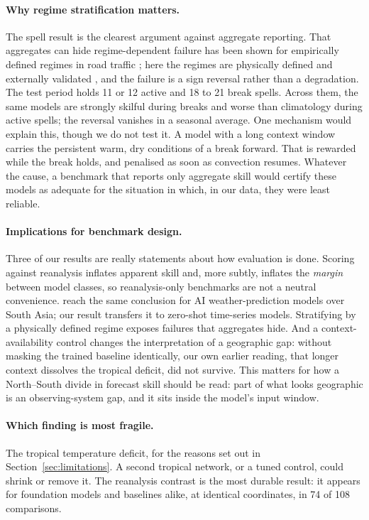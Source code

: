 \paragraph{Why regime stratification matters.} The spell result is the clearest argument against aggregate
reporting. That aggregates can hide regime-dependent failure has been shown for empirically defined regimes in
road traffic \citep{wang2026regime}; here the regimes are physically defined and externally validated
\citep{ferdoushi2023spells}, and the failure is a sign reversal rather than a degradation. The test period holds 11 or 12 active and 18 to 21 break spells. Across them, the same models are strongly
skilful during breaks and worse than climatology during active spells; the reversal vanishes in a seasonal
average. One mechanism would explain this, though we do not test it. A model with a
long context window carries the persistent warm, dry conditions of a break forward. That is rewarded while the
break holds, and penalised as soon as convection resumes. Whatever the cause, a benchmark that reports only aggregate skill would
certify these models as adequate for the situation in which, in our data, they were least reliable.

\paragraph{Implications for benchmark design.} Three of our results are really statements about how evaluation is
done. Scoring against reanalysis inflates apparent skill and, more subtly, inflates the \emph{margin} between model
classes, so reanalysis-only benchmarks \citep{rasp2024weatherbench2,nathaniel2024chaosbench} are not a neutral
convenience. \citet{gupta2026mausam} reach the same conclusion for AI weather-prediction models over South Asia;
our result transfers it to zero-shot time-series models. Stratifying by a physically defined regime
exposes failures that aggregates hide. And a context-availability control changes the interpretation of a
geographic gap: without masking the trained baseline identically, our own earlier reading, that longer context
dissolves the tropical deficit, did not survive. This matters for how a North--South divide in forecast skill
\citep{mozaffari2026inequality,masi2025safe} should be read: part of what looks geographic is an
observing-system gap, and it sits inside the model's input window.

\paragraph{Which finding is most fragile.} The tropical temperature deficit, for the reasons set out in
Section~\ref{sec:limitations}. A second tropical network, or a tuned control, could shrink or remove it. The reanalysis contrast is the most durable result: it appears for
foundation models and baselines alike, at identical coordinates, in 74 of 108 comparisons.

